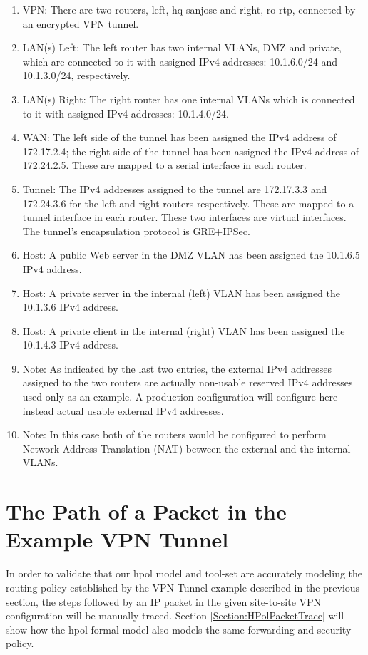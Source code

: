 \documentclass[12pt,letterpaper]{report}
\begin{document}
\begin{enumerate}
	\item%
	{VPN: There are two routers, left, hq-sanjose and right, ro-rtp, connected by an encrypted VPN tunnel.}
	\item%
	{LAN(s) Left: The left router has two internal VLANs, DMZ and private, which are connected to it with assigned IPv4 addresses: 10.1.6.0/24 and 10.1.3.0/24, respectively.}
	\item%
	{LAN(s) Right: The right router has one internal VLANs which is connected to it with assigned IPv4 addresses: 10.1.4.0/24.}
	\item%
	{WAN: The left side of the tunnel has been assigned the IPv4 address of 172.17.2.4; the right side of the tunnel has been assigned the IPv4 address of 172.24.2.5. These are mapped to a serial interface in each router.}
	\item%
	{Tunnel: The IPv4 addresses assigned to the tunnel are 172.17.3.3 and 172.24.3.6 for the left and right routers respectively. These are mapped to a tunnel interface in each router. These two interfaces are virtual interfaces. The tunnel's encapsulation protocol is GRE+IPSec.}
	\item%
	{Host: A public Web server in the DMZ VLAN has been assigned the 10.1.6.5 IPv4 address.}
	\item%
	{Host: A private server in the internal (left) VLAN has been assigned the 10.1.3.6 IPv4 address.}
	\item%
	{Host: A private client in the internal (right) VLAN has been assigned the 10.1.4.3 IPv4 address.}
	\item%
	{Note: As indicated by the last two entries, the external IPv4 addresses assigned to the two routers are actually non-usable reserved IPv4 addresses used only as an example. A production configuration will configure here instead actual usable external IPv4 addresses.}
	\item%
	{Note: In this case both of the routers would be configured to perform Network Address Translation (NAT) between the external and the internal VLANs.}
\end{enumerate}

\section{The Path of a Packet in the Example VPN Tunnel}

{In order to validate that our \ac{hpol} model and tool-set are accurately modeling the routing policy established by the VPN Tunnel example described in the previous section, the steps followed by an IP packet in the given site-to-site VPN configuration will be manually traced. Section \ref{Section:HPolPacketTrace} will show how the \ac{hpol} formal model also models the same forwarding and security policy.}
\end{document}
